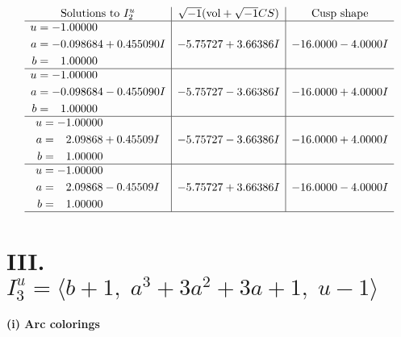 \documentclass[1p]{elsarticle_modified}
\theoremstyle{definition}
\newcommand{\I}{\sqrt{-1}}
\begin{document}
$$\begin{array}{c|c|c}  
\text{Solutions to }I^u_{2}& \I (\text{vol} + \sqrt{-1}CS) & \text{Cusp shape}\\
 \hline 
\begin{aligned}
u &= -1.00000\phantom{ +0.000000I} \\
a &= -0.098684 + 0.455090 I \\
b &= \phantom{-}1.00000\phantom{ +0.000000I}\end{aligned}
 & -5.75727 + 3.66386 I & -16.0000 - 4.0000 I \\ \hline\begin{aligned}
u &= -1.00000\phantom{ +0.000000I} \\
a &= -0.098684 - 0.455090 I \\
b &= \phantom{-}1.00000\phantom{ +0.000000I}\end{aligned}
 & -5.75727 - 3.66386 I & -16.0000 + 4.0000 I \\ \hline\begin{aligned}
u &= -1.00000\phantom{ +0.000000I} \\
a &= \phantom{-}2.09868 + 0.45509 I \\
b &= \phantom{-}1.00000\phantom{ +0.000000I}\end{aligned}
 & -5.75727 - 3.66386 I & -16.0000 + 4.0000 I \\ \hline\begin{aligned}
u &= -1.00000\phantom{ +0.000000I} \\
a &= \phantom{-}2.09868 - 0.45509 I \\
b &= \phantom{-}1.00000\phantom{ +0.000000I}\end{aligned}
 & -5.75727 + 3.66386 I & -16.0000 - 4.0000 I\\
 \hline 
 \end{array}$$\newpage\newpage\renewcommand{\arraystretch}{1}
\centering \section*{III. $I^u_{3}= \langle b+1,\;a^3+3 a^2+3 a+1,\;u-1 \rangle$}
\flushleft \textbf{(i) Arc colorings}\\
\end{document}

